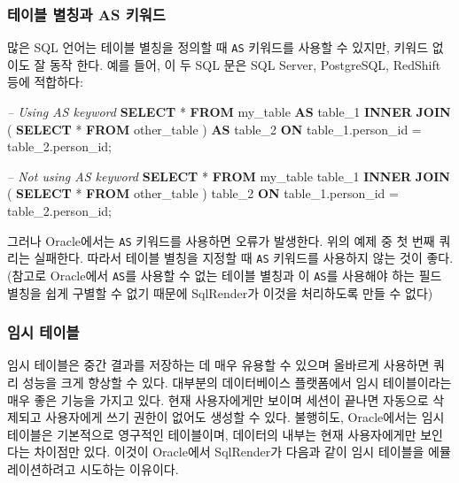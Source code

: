 \documentclass[10.5pt]{book}
\newenvironment{Shaded}{\begin{snugshade}}{\end{snugshade}}
\newcommand{\KeywordTok}[1]{\textcolor[rgb]{0.13,0.29,0.53}{\textbf{#1}}}
\newcommand{\DecValTok}[1]{\textcolor[rgb]{0.00,0.00,0.81}{#1}}
\newcommand{\CommentTok}[1]{\textcolor[rgb]{0.56,0.35,0.01}{\textit{#1}}}
\newcommand{\NormalTok}[1]{#1}
\theoremstyle{definition}
\theoremstyle{definition}
\theoremstyle{definition}
\theoremstyle{remark}
\begin{document}
\subsubsection*{테이블 별칭과 AS 키워드}\label{--as-}

많은 SQL 언어는 테이블 별칭을 정의할 때 \texttt{AS} 키워드를 사용할 수
있지만, 키워드 없이도 잘 동작 한다. 예를 들어, 이 두 SQL 문은 SQL
Server, PostgreSQL, RedShift 등에 적합하다:

\begin{Shaded}
\begin{Highlighting}[]
\CommentTok{-- Using AS keyword}
\KeywordTok{SELECT}\NormalTok{ *}
\KeywordTok{FROM}\NormalTok{ my_table }\KeywordTok{AS}\NormalTok{ table_}\DecValTok{1}
\KeywordTok{INNER} \KeywordTok{JOIN}\NormalTok{ (}
  \KeywordTok{SELECT}\NormalTok{ * }\KeywordTok{FROM}\NormalTok{ other_table}
\NormalTok{) }\KeywordTok{AS}\NormalTok{ table_}\DecValTok{2}
\KeywordTok{ON}\NormalTok{ table_1.person_id = table_2.person_id;}

\CommentTok{-- Not using AS keyword}
\KeywordTok{SELECT}\NormalTok{ *}
\KeywordTok{FROM}\NormalTok{ my_table table_}\DecValTok{1}
\KeywordTok{INNER} \KeywordTok{JOIN}\NormalTok{ (}
  \KeywordTok{SELECT}\NormalTok{ * }\KeywordTok{FROM}\NormalTok{ other_table}
\NormalTok{) table_}\DecValTok{2}
\KeywordTok{ON}\NormalTok{ table_1.person_id = table_2.person_id;}
\end{Highlighting}
\end{Shaded}

그러나 Oracle에서는 \texttt{AS} 키워드를 사용하면 오류가 발생한다. 위의
예제 중 첫 번째 쿼리는 실패한다. 따라서 테이블 별칭을 지정할 때
\texttt{AS} 키워드를 사용하지 않는 것이 좋다. (참고로 Oracle에서
\texttt{AS}를 사용할 수 없는 테이블 별칭과 이 \texttt{AS}를 사용해야
하는 필드 별칭을 쉽게 구별할 수 없기 때문에 SqlRender가 이것을
처리하도록 만들 수 없다)

\subsubsection*{임시 테이블}\label{-}

임시 테이블은 중간 결과를 저장하는 데 매우 유용할 수 있으며 올바르게
사용하면 쿼리 성능을 크게 향상할 수 있다. 대부분의 데이터베이스
플랫폼에서 임시 테이블이라는 매우 좋은 기능을 가지고 있다. 현재
사용자에게만 보이며 세션이 끝나면 자동으로 삭제되고 사용자에게 쓰기
권한이 없어도 생성할 수 있다. 불행히도, Oracle에서는 임시테이블은
기본적으로 영구적인 테이블이며, 데이터의 내부는 현재 사용자에게만
보인다는 차이점만 있다. 이것이 Oracle에서 SqlRender가 다음과 같이 임시
테이블을 에뮬레이션하려고 시도하는 이유이다.
\end{document}
